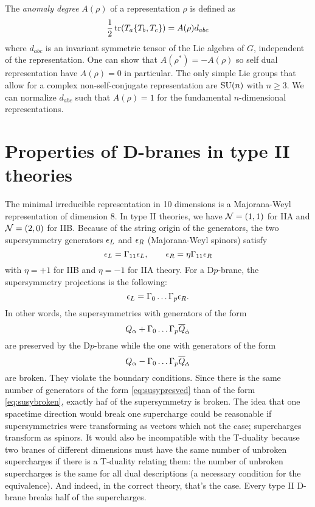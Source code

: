     The \emph{anomaly degree} $A(\rho)$ of a representation $\rho$ is defined as
    \begin{equation}
        \frac{1}{2}\tr(T_a\{T_b,T_c\})=A(\rho)d_{abc}
    \end{equation}
    where $d_{abc}$ is an invariant symmetric tensor of the Lie algebra of $G$, independent of the representation. One can show that $A(\rho^*)=-A(\rho)$ so self dual representation have $A(\rho)=0$ in particular. The only simple Lie groups that allow for a complex non-self-conjugate representation are $\text{SU}(n)$ with $n\geq3$. We can normalize $d_{abc}$ such that $A(\rho)=1$ for the fundamental $n$-dimensional representations.

\section{Properties of D-branes in type II theories}

    The minimal irreducible representation in 10 dimensions is a Majorana-Weyl representation of dimension 8. In type II theories, we have $\mathcal{N}=(1,1)$ for IIA and $\mathcal{N}=(2,0)$ for IIB. Because of the string origin of the generators, the two supersymmetry generators $\epsilon_L$ and $\epsilon_R$ (Majorana-Weyl spinors) satisfy
    \begin{equation}
        \epsilon_L=\Gamma_{11}\epsilon_L,\qquad \epsilon_R=\eta\Gamma_{11}\epsilon_R
    \end{equation}
    with $\eta=+1$ for IIB and $\eta=-1$ for IIA theory. For a D$p$-brane, the supersymmetry projections is the following:
    \begin{equation}
        \epsilon_L=\Gamma_0\dots\Gamma_p\epsilon_R.
    \end{equation}
    In other words, the supersymmetries with generators of the form
    \begin{equation}
        Q_\alpha+\Gamma_0\dots\Gamma_p\overline{Q}_{\dot{\alpha}}\label{eq:susypresved}
    \end{equation}
    are preserved by the D$p$-brane while the one with generators of the form
    \begin{equation}
        Q_\alpha-\Gamma_0\dots\Gamma_p\overline{Q}_{\dot{\alpha}}\label{eq:susybroken}
    \end{equation}
    are broken. They violate the boundary conditions. Since there is the same number of generators of the form \eqref{eq:susypresved} than of the form \eqref{eq:susybroken}, exactly haf of the supersymmetry is broken. The idea that one spacetime direction would break one supercharge could be reasonable if supersymmetries were transforming as vectors which not the case; supercharges transform as spinors. It would also be incompatible with the T-duality because two branes of different dimensions must have the same number of unbroken supercharges if there is a T-duality relating them: the number of unbroken supercharges is the same for all dual descriptions (a necessary condition for the equivalence). And indeed, in the correct theory, that's the case. Every type II D-brane breaks half of the supercharges.

